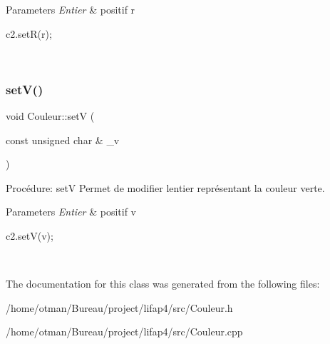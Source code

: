 \begin{DoxyParams}{Parameters}
{\em Entier} & positif r 
\begin{DoxyCode}
c2.setR(r);
\end{DoxyCode}
 \\
\hline
\end{DoxyParams}
\mbox{\label{classCouleur_a7aa9a8ce100008ef3551064b1c7bfe47}} 
\subsubsection{\texorpdfstring{set\+V()}{setV()}}
{\footnotesize\ttfamily void Couleur\+::setV (\begin{DoxyParamCaption}\item[{const unsigned char \&}]{\+\_\+v }\end{DoxyParamCaption})}



Procédure\+: setV Permet de modifier l\textquotesingle{}entier représentant la couleur verte. 


\begin{DoxyParams}{Parameters}
{\em Entier} & positif v 
\begin{DoxyCode}
c2.setV(v);
\end{DoxyCode}
 \\
\hline
\end{DoxyParams}


The documentation for this class was generated from the following files\+:\begin{DoxyCompactItemize}
\item 
/home/otman/\+Bureau/project/lifap4/src/Couleur.\+h\item 
/home/otman/\+Bureau/project/lifap4/src/Couleur.\+cpp\end{DoxyCompactItemize}
